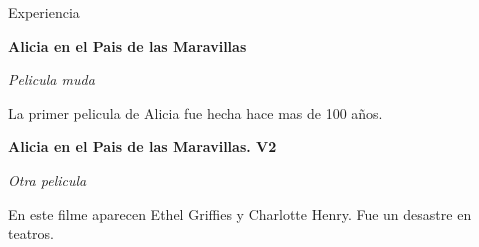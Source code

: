\begin{rubric}{Experiencia}

    \textbf{Alicia en el Pais de las Maravillas}\par
    \textit{Pelicula muda}\par
    La primer pelicula de Alicia fue hecha hace mas de 100 años.

    \textbf{Alicia en el Pais de las Maravillas. V2}\par
    \textit{Otra pelicula}\par
    En este filme aparecen Ethel Griffies y Charlotte Henry. Fue un
    desastre en teatros.
\end{rubric}
